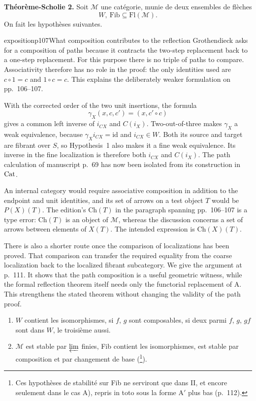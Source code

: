\textbf{Théorème-Scholie 2.} Soit $\mathcal{M}$ une catégorie, munie de deux ensembles de flèches
\[
W,\ \mathrm{Fib}\subseteq\mathrm{Fl}(\mathcal{M}).
\]
On fait les hypothèses suivantes.

\begin{dcomment}{exposition}{p107}{What composition contributes to the reflection}
Grothendieck asks for a composition of paths because it contracts the two-step replacement back to a one-step replacement. For this purpose there is no triple of paths to compare. Associativity therefore has no role in the proof: the only identities used are $c\circ1=c$ and $1\circ c=c$. This explains the deliberately weaker formulation on pp.~106--107.

With the corrected order of the two unit insertions, the formula
\[
 \gamma_X(x,c,c')=(x,c'\circ c)
\]
gives a common left inverse of $i_{CX}$ and $C(i_X)$. Two-out-of-three makes $\gamma_X$ a weak equivalence, because $\gamma_Xi_{CX}=\mathrm{id}$ and $i_{CX}\in W$. Both its source and target are fibrant over $S$, so Hypothesis~1 also makes it a fine weak equivalence. Its inverse in the fine localization is therefore both $i_{CX}$ and $C(i_X)$. The path calculation of manuscript p.~69 has now been isolated from its construction in $\mathrm{Cat}$.

An internal category would require associative composition in addition to the endpoint and unit identities, and its set of arrows on a test object $T$ would be $P(X)(T)$. The edition's $\mathrm{Ch}(T)$ in the paragraph spanning pp.~106--107 is a type error: $\mathrm{Ch}(T)$ is an object of $\mathcal M$, whereas the discussion concerns a set of arrows between elements of $X(T)$. The intended expression is $\mathrm{Ch}(X)(T)$.

There is also a shorter route once the comparison of localizations has been proved. That comparison can transfer the required equality from the coarse localization back to the localized fibrant subcategory. We give the argument at p.~111. It shows that the path composition is a useful geometric witness, while the formal reflection theorem itself needs only the functorial replacement of A. This strengthens the stated theorem without changing the validity of the path proof.
\end{dcomment}


\begin{enumerate}[label={}]
\item[$1^o$] $W$ contient les isomorphismes, si $f$, $g$ sont composables, si deux parmi $f$, $g$, $gf$ sont dans $W$, le troisième aussi.
\item[$2^o$] $\mathcal{M}$ est stable par $\varprojlim$ finies, Fib contient les isomorphismes, est stable par composition et par changement de base (\footnote[59]{Ces hypothèses de stabilité sur Fib ne serviront que dans II, et encore seulement dans le cas A), repris in toto sous la forme A$'$ plus bas (p.~112).}).
\end{enumerate}

